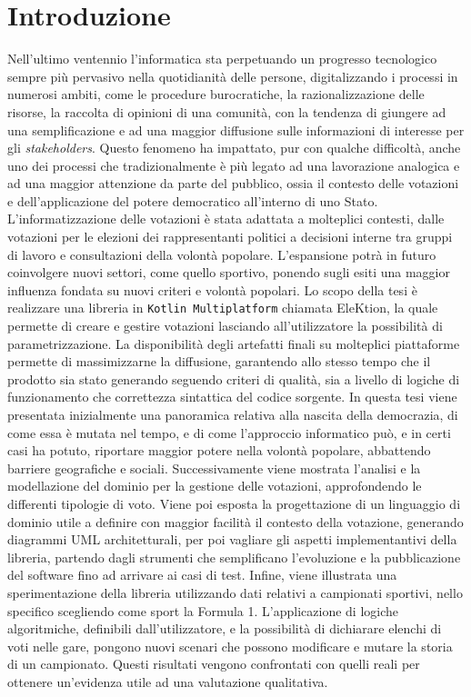 \documentclass[12pt,a4paper,openright,twoside]{book}
\begin{document}
\chapter{Introduzione}
\label{chap:introduction}
Nell'ultimo ventennio l'informatica sta perpetuando un progresso tecnologico sempre più pervasivo
nella quotidianità delle persone, digitalizzando i processi in numerosi ambiti, come le procedure burocratiche,
la razionalizzazione delle risorse, la raccolta di opinioni di una comunità,
con la tendenza di giungere ad una semplificazione e ad una maggior diffusione sulle informazioni di
interesse per gli \textit{stakeholders}.
Questo fenomeno ha impattato, pur con qualche difficoltà, anche uno dei processi che tradizionalmente
è più legato ad una lavorazione analogica e ad una maggior attenzione da parte del pubblico,
ossia il contesto delle votazioni e dell'applicazione del potere democratico all'interno di uno Stato.
L'informatizzazione delle votazioni è stata adattata a molteplici contesti, dalle votazioni per le  
elezioni dei rappresentanti politici a decisioni interne tra gruppi di lavoro e consultazioni
della volontà popolare. L'espansione potrà in futuro coinvolgere nuovi settori, come quello sportivo, ponendo sugli esiti una maggior
influenza fondata su nuovi criteri e volontà popolari.
Lo scopo della tesi è realizzare una libreria in \texttt{Kotlin Multiplatform} chiamata EleKtion, la quale permette di creare e gestire
votazioni lasciando all'utilizzatore la possibilità di parametrizzazione.
La disponibilità degli artefatti finali su molteplici piattaforme permette di massimizzarne la diffusione, garantendo
allo stesso tempo che il prodotto sia stato generando seguendo criteri di qualità, sia a livello di logiche di funzionamento
che correttezza sintattica del codice sorgente.
In questa tesi viene presentata inizialmente una panoramica relativa alla nascita della democrazia, di come essa è mutata nel tempo,
e di come l'approccio informatico può, e in certi casi ha potuto, riportare maggior potere nella volontà popolare, abbattendo barriere
geografiche e sociali.
Successivamente viene mostrata l'analisi e la modellazione del dominio per la gestione delle votazioni,
approfondendo le differenti tipologie di voto.
Viene poi esposta la progettazione di un linguaggio di dominio utile a definire con maggior facilità il contesto della votazione,
generando diagrammi UML architetturali, per poi vagliare gli aspetti implementantivi della libreria, 
partendo dagli strumenti che semplificano l'evoluzione e la pubblicazione del software fino ad arrivare ai casi di test.
Infine, viene illustrata una sperimentazione della libreria utilizzando dati relativi a campionati sportivi, nello specifico
scegliendo come sport la Formula 1. L'applicazione di logiche algoritmiche, definibili dall'utilizzatore, e la possibilità
di dichiarare elenchi di voti nelle gare, pongono nuovi scenari che possono modificare e mutare la storia di un campionato.
Questi risultati vengono confrontati con quelli reali per ottenere un'evidenza utile ad una valutazione qualitativa.
\end{document}
